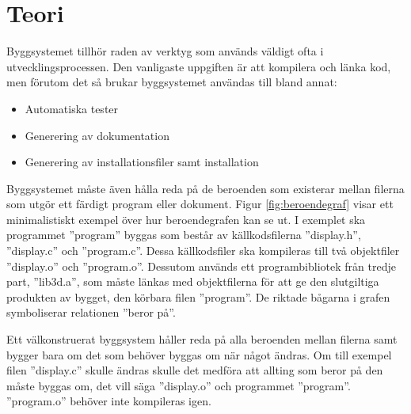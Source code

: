 \section{Teori}
Byggsystemet tillhör raden av verktyg som används väldigt ofta i utvecklingsprocessen. Den vanligaste uppgiften är att kompilera och länka kod, men förutom det så brukar byggsystemet användas till bland annat:

\begin{itemize}
  \item Automatiska tester
  \item Generering av dokumentation
  \item Generering av installationsfiler samt installation
\end{itemize}

Byggsystemet måste även hålla reda på de beroenden som existerar mellan filerna som utgör ett färdigt program eller dokument. Figur \ref{fig:beroendegraf} visar ett minimalistiskt exempel över hur beroendegrafen kan se ut. I exemplet ska programmet ''program'' byggas som består av källkodsfilerna ''display.h'', ''display.c'' och ''program.c''. Dessa källkodsfiler ska kompileras till två objektfiler ''display.o'' och ''program.o''. Dessutom används ett programbibliotek från tredje part, ''lib3d.a'', som måste länkas med objektfilerna för att ge den slutgiltiga produkten av bygget, den körbara filen ''program''. De riktade bågarna i grafen symboliserar relationen ''beror på''.

Ett välkonstruerat byggsystem håller reda på alla beroenden mellan filerna samt bygger bara om det som behöver byggas om när något ändras. Om till exempel filen ''display.c'' skulle ändras skulle det medföra att allting som beror på den måste byggas om, det vill säga ''display.o'' och programmet ''program''. ''program.o'' behöver inte kompileras igen.

